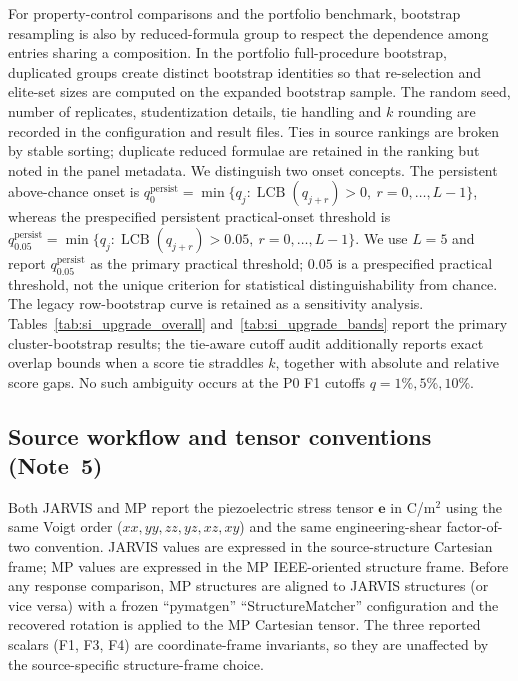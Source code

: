 \documentclass[11pt]{article}
\begin{document}
For property-control comparisons and the portfolio benchmark, bootstrap resampling is also by reduced-formula group to respect the dependence among entries sharing a composition.
In the portfolio full-procedure bootstrap, duplicated groups create distinct bootstrap identities so that re-selection and elite-set sizes are computed on the expanded bootstrap sample.
The random seed, number of replicates, studentization details, tie handling and $k$ rounding are recorded in the configuration and result files.
Ties in source rankings are broken by stable sorting; duplicate reduced formulae are retained in the ranking but noted in the panel metadata.
We distinguish two onset concepts. The persistent above-chance onset is $q^{\mathrm{persist}}_{0}=\min\{q_j:\operatorname{LCB}(q_{j+r})>0,\ r=0,\ldots,L-1\}$, whereas the prespecified persistent practical-onset threshold is $q^{\mathrm{persist}}_{0.05}=\min\{q_j:\operatorname{LCB}(q_{j+r})>0.05,\ r=0,\ldots,L-1\}$. We use $L=5$ and report $q^{\mathrm{persist}}_{0.05}$ as the primary practical threshold; $0.05$ is a prespecified practical threshold, not the unique criterion for statistical distinguishability from chance.
The legacy row-bootstrap curve is retained as a sensitivity analysis. Tables~\ref{tab:si_upgrade_overall} and~\ref{tab:si_upgrade_bands} report the primary cluster-bootstrap results; the tie-aware cutoff audit additionally reports exact overlap bounds when a score tie straddles $k$, together with absolute and relative score gaps. No such ambiguity occurs at the P0 F1 cutoffs $q=1\%,5\%,10\%$.

\subsection{Source workflow and tensor conventions (Note~5)}

Both JARVIS and MP report the piezoelectric stress tensor $\mathbf{e}$ in C/m$^2$ using the same Voigt order ($xx,yy,zz,yz,xz,xy$) and the same engineering-shear factor-of-two convention.
JARVIS values are expressed in the source-structure Cartesian frame; MP values are expressed in the MP IEEE-oriented structure frame.
Before any response comparison, MP structures are aligned to JARVIS structures (or vice versa) with a frozen ``pymatgen'' ``StructureMatcher'' configuration and the recovered rotation is applied to the MP Cartesian tensor.
The three reported scalars (F1, F3, F4) are coordinate-frame invariants, so they are unaffected by the source-specific structure-frame choice.
\end{document}
